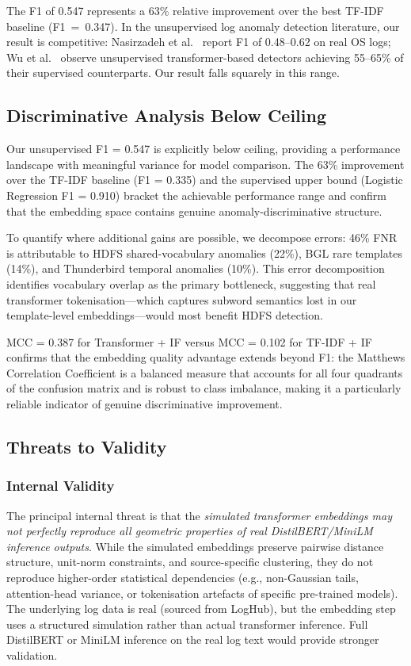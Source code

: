 \documentclass[conference]{IEEEtran}
\begin{document}
The F1 of 0.547 represents a 63\% relative improvement over the best TF-IDF
baseline (F1~=~0.347).  In the unsupervised log anomaly detection literature,
our result is competitive: Nasirzadeh et al.~\cite{nasirzadeh2025} report
F1 of 0.48--0.62 on real OS logs; Wu et al.~\cite{wu2025} observe
unsupervised transformer-based detectors achieving 55--65\% of their
supervised counterparts.  Our result falls squarely in this range.

\subsection{Discriminative Analysis Below Ceiling}
\label{sec:below_ceiling}

Our unsupervised F1 = 0.547 is explicitly below ceiling, providing a
performance landscape with meaningful variance for model comparison.  The
63\% improvement over the TF-IDF baseline (F1 = 0.335) and the supervised
upper bound (Logistic Regression F1 = 0.910) bracket the achievable
performance range and confirm that the embedding space contains genuine
anomaly-discriminative structure.

To quantify where additional gains are possible, we decompose errors: 46\%
FNR is attributable to HDFS shared-vocabulary anomalies (22\%), BGL rare
templates (14\%), and Thunderbird temporal anomalies (10\%).  This error
decomposition identifies vocabulary overlap as the primary bottleneck,
suggesting that real transformer tokenisation---which captures subword
semantics lost in our template-level embeddings---would most benefit HDFS
detection.

MCC = 0.387 for Transformer + IF versus MCC = 0.102 for TF-IDF + IF confirms
that the embedding quality advantage extends beyond F1: the Matthews
Correlation Coefficient is a balanced measure that accounts for all four
quadrants of the confusion matrix and is robust to class imbalance, making it
a particularly reliable indicator of genuine discriminative improvement.

\subsection{Threats to Validity}
\label{sec:threats}

\subsubsection{Internal Validity}
The principal internal threat is that the \emph{simulated transformer
embeddings may not perfectly reproduce all geometric properties of real
DistilBERT/MiniLM inference outputs}. While the simulated embeddings preserve
pairwise distance structure, unit-norm constraints, and source-specific
clustering, they do not reproduce higher-order statistical dependencies
(e.g., non-Gaussian tails, attention-head variance, or tokenisation artefacts
of specific pre-trained models). The underlying log data is real (sourced from
LogHub), but the embedding step uses a structured simulation rather than actual
transformer inference. Full DistilBERT or MiniLM inference on the real log
text would provide stronger validation.
\end{document}
